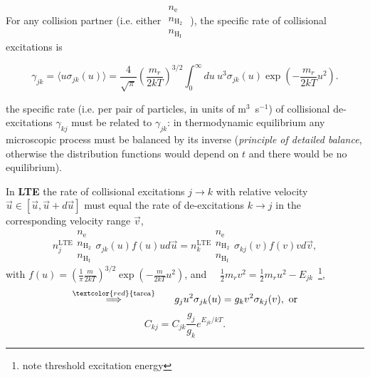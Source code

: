 \vfill



\foilhead{}

For any collision partner (i.e. either $\begin{array}{c}  n_\mathrm{e}
\\  n_\mathrm{H_2} \\  n_\mathrm{H_I} \end{array} $ ), the specific rate of
collisional excitations is

\[
\gamma_{jk} = \langle u \sigma_{jk}(u) \rangle = \frac{4}{\sqrt{\pi}} \left(\frac{m_r}{2kT} \right)^{3/2} \int_0^\infty du ~ u^3 \sigma_{jk}(u) \exp\left(  - \frac{m_r}{2kT} u^2 \right).
\]

\pause the specific rate (i.e. per pair of  particles, in units of
m$^{3}$~s$^{-1}$) of collisional de-excitations $\gamma_{kj}$ must be
related to $\gamma_{jk}$: in thermodynamic equilibrium any microscopic
process must be balanced by its inverse ({\em principle of detailed
balance}, otherwise the distribution functions would depend on $t$ and
there would be no equilibrium).


\foilhead{}

In {\bf LTE} the rate of collisional excitations $j\rightarrow k$ with
relative velocity $\vec{u} \in [\vec{u},\vec{u}+d\vec{u}]$ must equal
the rate of de-excitations $k \rightarrow j$ in the corresponding
velocity range $\vec{v}$, \[
n^\mathrm{LTE}_j \begin{array}{c}  n_\mathrm{e} \\  n_\mathrm{H_2} \\  n_\mathrm{H_I} \end{array}  \sigma_{jk}(u) f(u)  u d\vec{u}  = 
n^\mathrm{LTE}_k \begin{array}{c}  n_\mathrm{e} \\  n_\mathrm{H_2} \\
n_\mathrm{H_I} \end{array}  \sigma_{kj}(v) f(v)  v d\vec{v}  , \]
with   $ f(u) =   \left(\frac{1}{\pi}\frac{m}{2kT} \right)^{3/2}
\exp\left(-\frac{m}{2kT} u^2 \right) $,  and~~ $ \frac{1}{2}m_r v^2 =
\frac{1}{2} m_r u^2 - E_{jk}$~\footnote{note threshold excitation energy},  
\[\stackrel{\textcolor{red}{\mathrm{tarea}}} \Longrightarrow  ~~~~~  g_j u^2 \sigma_{jk}(u) = g_k v^2 \sigma_{kj}(v),~\text{or} \]
\[ C_{kj}=C_{jk} \frac{g_{j}}{g_{k}} e^{E_{jk}/kT} .\] 


